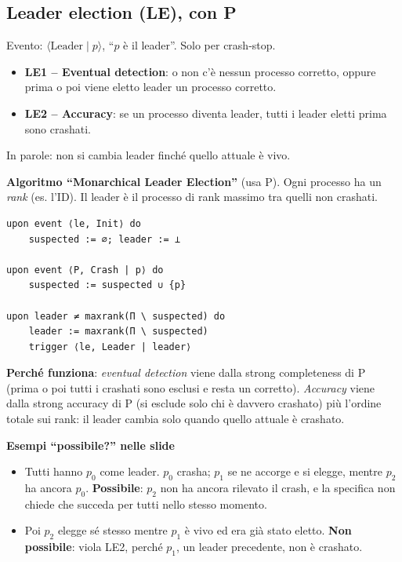 \subsection{Leader election (LE), con P}

Evento: \(\langle \text{Leader} \mid p \rangle\), ``\(p\) è il leader''. Solo per crash-stop.

\begin{itemize}
\tightlist
\item
  \textbf{LE1 -- Eventual detection}: o non c'è nessun processo corretto, oppure prima o poi viene eletto leader un processo corretto.
\item
  \textbf{LE2 -- Accuracy}: se un processo diventa leader, tutti i leader eletti prima sono crashati.
\end{itemize}

In parole: non si cambia leader finché quello attuale è vivo.

\textbf{Algoritmo ``Monarchical Leader Election''} (usa P). Ogni processo ha un \emph{rank} (es. l'ID). Il leader è il processo di rank massimo tra quelli non crashati.

\begin{verbatim}
upon event ⟨le, Init⟩ do
    suspected := ∅; leader := ⊥

upon event ⟨P, Crash | p⟩ do
    suspected := suspected ∪ {p}

upon leader ≠ maxrank(Π \ suspected) do
    leader := maxrank(Π \ suspected)
    trigger ⟨le, Leader | leader⟩
\end{verbatim}

\textbf{Perché funziona}: \emph{eventual detection} viene dalla strong completeness di P (prima o poi tutti i crashati sono esclusi e resta un corretto). \emph{Accuracy} viene dalla strong accuracy di P (si esclude solo chi è davvero crashato) più l'ordine totale sui rank: il leader cambia solo quando quello attuale è crashato.

\textbf{Esempi ``possibile?'' nelle slide}

\begin{itemize}
\tightlist
\item
  Tutti hanno \(p_0\) come leader. \(p_0\) crasha; \(p_1\) se ne accorge e si elegge, mentre \(p_2\) ha ancora \(p_0\). \textbf{Possibile}: \(p_2\) non ha ancora rilevato il crash, e la specifica non chiede che succeda per tutti nello stesso momento.
\item
  Poi \(p_2\) elegge sé stesso mentre \(p_1\) è vivo ed era già stato eletto. \textbf{Non possibile}: viola LE2, perché \(p_1\), un leader precedente, non è crashato.
\end{itemize}

